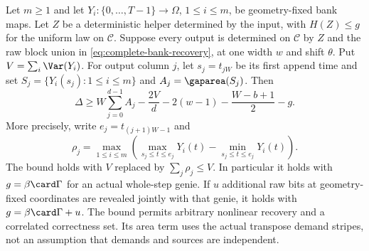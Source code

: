 \begin{theorem}\label{thm:cyclic-freezing}
Let $m\ge1$ and let $Y_i:\{0,\ldots,T-1\}\to\Omega$, $1\le i\le m$,
be geometry-fixed bank maps. Let $Z$ be a
deterministic helper determined by the input, with $H(Z)\le g$ for the
uniform law on $\mathcal C$. Suppose every output is determined on
$\mathcal C$ by $Z$ and the raw block union in
\eqref{eq:complete-bank-recovery}, at one width $w$ and shift $\theta$. Put
$V=\sum_i\Var(Y_i)$. For output column $j$, let
$s_j=t_{jW}$ be its first append time and set
$S_j=\{Y_i(s_j):1\le i\le m\}$ and $A_j=\gaparea(S_j)$. Then
\begin{equation}\label{eq:cyclic-freezing}
 \Delta\ge
 W\sum_{j=0}^{d-1}A_j
       -\frac{2V}{d}-2(w-1)-\frac{W-b+1}{2}
       -g.
\end{equation}
More precisely, write $e_j=t_{(j+1)W-1}$ and
\[
 \rho_j=\max_{1\le i\le m}
 \left(\max_{s_j\le t\le e_j}Y_i(t)
       -\min_{s_j\le t\le e_j}Y_i(t)\right).
\]
The bound holds with $V$ replaced by $\sum_j\rho_j\le V$.
In particular it holds with $g=\beta\card\Gamma$ for an actual
whole-step genie. If $u$ additional raw bits at geometry-fixed coordinates
are revealed jointly with that genie, it holds with
$g=\beta\card\Gamma+u$.
The bound permits arbitrary nonlinear recovery and a correlated
correctness set. Its area term uses the actual transpose demand stripes,
not an assumption that demands and sources are independent.
\end{theorem}

